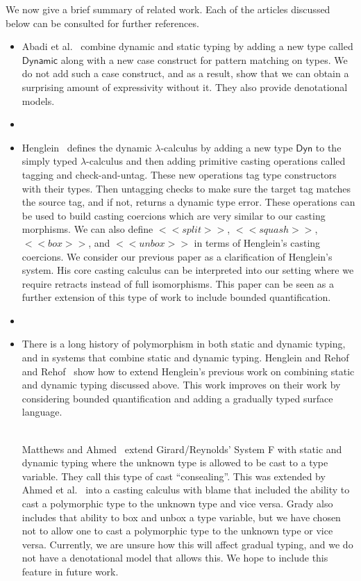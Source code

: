 We now give a brief summary of related work. Each of the articles
discussed below can be consulted for further references.
\begin{itemize}
\item Abadi et al.~\cite{Abadi:1989} combine dynamic and static typing
  by adding a new type called $\mathsf{Dynamic}$ along with a new case
  construct for pattern matching on types.  We do not add such a case
  construct, and as a result, show that we can obtain a surprising
  amount of expressivity without it.  They also provide denotational
  models.
\item[]
\item Henglein~\cite{Henglein:1994} defines the dynamic
  $\lambda$-calculus by adding a new type $\mathsf{Dyn}$ to the simply
  typed $\lambda$-calculus and then adding primitive casting
  operations called tagging and check-and-untag.  These new operations
  tag type constructors with their types.  Then untagging checks to
  make sure the target tag matches the source tag, and if not, returns
  a dynamic type error.  These operations can be used to build casting
  coercions which are very similar to our casting morphisms. We can
  also define $<<split>>$, $<<squash>>$, $<<box>>$, and $<<unbox>>$ in
  terms of Henglein's casting coercions.  We consider our previous
  paper \cite{Eades:2017} as a clarification of Henglein's system.
  His core casting calculus can be interpreted into our setting where
  we require retracts instead of full isomorphisms.  This paper can be
  seen as a further extension of this type of work to include bounded
  quantification.
\item[]
\item There is a long history of polymorphism in both static and
  dynamic typing, and in systems that combine static and dynamic
  typing. Henglein and Rehof~\cite{Henglein:1995} and
  Rehof~\cite{Rehof:1995} show how to extend Henglein's previous work
  on combining static and dynamic typing discussed above.  This work
  improves on their work by considering bounded quantification and
  adding a gradually typed surface language.

  \ \\
  Matthews and Ahmed~\cite{Matthews:2008:PPT:1792878.1792881} extend
  Girard/Reynolds' System F with static and dynamic typing where the
  unknown type is allowed to be cast to a type variable.  They call
  this type of cast ``consealing''.  This was extended by Ahmed et
  al.~\cite{Ahmed:2011:BLA:1926385.1926409} into a casting calculus
  with blame that included the ability to cast a polymorphic type to
  the unknown type and vice versa.  Grady also includes that ability
  to box and unbox a type variable, but we have chosen not to allow
  one to cast a polymorphic type to the unknown type or vice
  versa. Currently, we are unsure how this will affect gradual typing,
  and we do not have a denotational model that allows this.  We hope
  to include this feature in future work.


\end{itemize}
